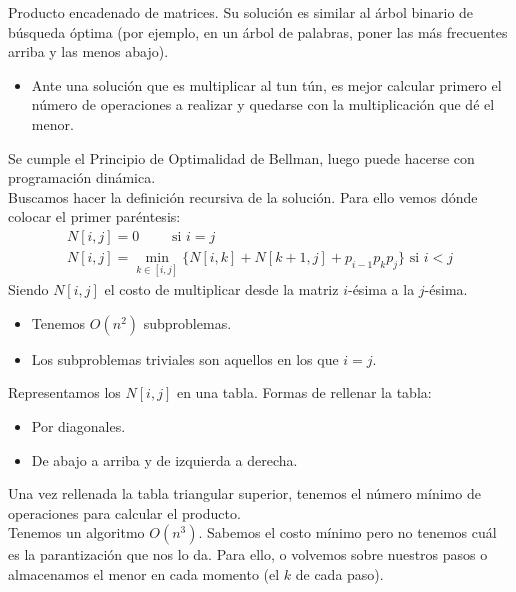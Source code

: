 \begin{ejemplo}
    Producto encadenado de matrices. Su solución es similar al árbol binario de búsqueda óptima (por ejemplo, en un árbol de palabras, poner las más frecuentes arriba y las menos abajo).

    \begin{itemize}
        \item Ante una solución que es multiplicar al tun tún, es mejor calcular primero el número de operaciones a realizar y quedarse con la multiplicación que dé el menor.
    \end{itemize}
    Se cumple el Principio de Optimalidad de Bellman, luego puede hacerse con programación dinámica.\\

    Buscamos hacer la definición recursiva de la solución. Para ello vemos dónde colocar el primer paréntesis:
    \begin{gather*}
        N[i,j] = 0 \qquad \text{\ si\ } i =j \\
        N[i,j] = \min_{k \in [i,j]} \{N[i,k] + N[k+1,j] + p_{i-1}p_kp_j \} \text{\ si\ } i <j
    \end{gather*}
    Siendo $N[i,j]$ el costo de multiplicar desde la matriz $i$-ésima a la $j$-ésima.
    \begin{itemize}
        \item Tenemos $O(n^2)$ subproblemas.
        \item Los subproblemas triviales son aquellos en los que $i=j$.
    \end{itemize}
    Representamos los $N[i,j]$ en una tabla. Formas de rellenar la tabla:
    \begin{itemize}
        \item Por diagonales.
        \item De abajo a arriba y de izquierda a derecha.
    \end{itemize}
    Una vez rellenada la tabla triangular superior, tenemos el número mínimo de operaciones para calcular el producto.\\

    Tenemos un algoritmo $O(n^3)$. Sabemos el costo mínimo pero no tenemos cuál es la parantización que nos lo da. Para ello, o volvemos sobre nuestros pasos o almacenamos el menor en cada momento (el $k$ de cada paso).
\end{ejemplo}

